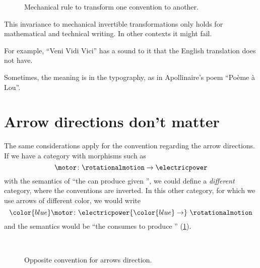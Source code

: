 \begin{figure*}[b]
	\hfill
	\caption{Mechanical rule to transform one convention to another.}
\end{figure*}

\vfill\clearpage
This invariance to mechanical invertible transformations only holds for mathematical and technical writing.
In other contexts it might fail.

For example, ``Veni Vidi Vici'' has a sound to it that the English translation does not have.

\begin{figure}[h!]
	\begin{center}
	\end{center}
\end{figure}

Sometimes, the meaning is in the typography, as in Apollinaire's poem ``Po\`eme \`a Lou''.

\begin{figure*}[h!]
	\begin{center}
	\end{center}
\end{figure*}

\section{Arrow directions don't matter}
The same considerations apply for the convention regarding the arrow directions.
If we have a category with morphisms such as
\begin{equation*}
	\motor \colon \rotationalmotion \to \electricpower
\end{equation*}
with the semantics of ``the \motor can produce \rotationalmotion given \electricpower'', we could define a \emph{different} category, where the conventions are inverted.
In this other category, for which we use arrows of different color, we would write
\begin{equation*}
	{\color{blue}\motor}
	\colon \electricpower {\color{blue} \to}\  \rotationalmotion
\end{equation*}
and the semantics would be ``the \motor consumes \electricpower to produce \rotationalmotion'' (\cref{fig:inverted}).

\begin{figure}[h!]
	\centering
	\\[+15pt]
	\caption{Opposite convention for arrows direction. }
	\label{fig:inverted}
\end{figure}

